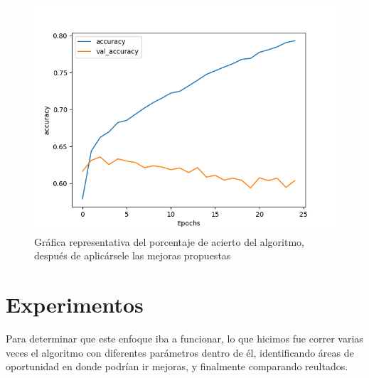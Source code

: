 \documentclass[a4]{sciposter}
\begin{document}
\begin{multicols}{2}
\begin{figure}
	\centering
	\captionsetup{type=figure}
	\setcounter{figure}{1}
	\includegraphics[scale=1.3]{img/Accuracy 2021-07.png}
	\caption{Gráfica representativa del porcentaje de acierto del algoritmo, después de aplicársele las mejoras propuestas}	
\end{figure}

\section{Experimentos}

Para determinar que este enfoque iba a funcionar, lo que hicimos fue correr varias veces el algoritmo con diferentes parámetros dentro de él, identificando áreas de oportunidad en donde podrían ir mejoras, y finalmente comparando reultados.


\end{multicols}
\end{document}
